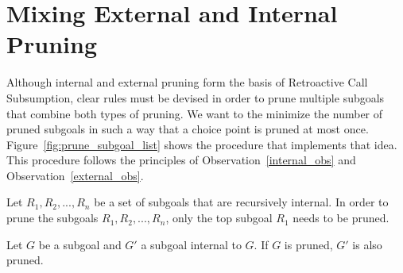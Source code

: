 \section{Mixing External and Internal Pruning}

Although internal and external pruning form the basis of Retroactive Call Subsumption, clear rules must
be devised in order to prune multiple subgoals that combine both types of pruning. We want to
the minimize the number of pruned subgoals in such a way that a choice point is pruned at
most once. Figure~\ref{fig:prune_subgoal_list} shows the procedure that implements that idea.
This procedure follows the principles of Observation~\ref{internal_obs} and Observation~\ref{external_obs}.

\begin{samepage}
\begin{pruning_obs}\label{internal_obs}
Let $R_1, R_2, ..., R_n$ be a set of subgoals that are recursively internal. In order to prune the subgoals
$R_1, R_2, ..., R_n$, only the top subgoal $R_1$ needs to be pruned.
\end{pruning_obs}
\end{samepage}
\begin{pruning_obs}\label{external_obs}
Let $G$ be a subgoal and $G'$ a subgoal internal to $G$. If $G$ is pruned, $G'$ is also pruned.
\end{pruning_obs}

